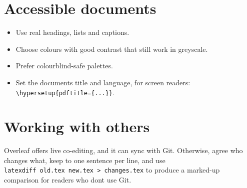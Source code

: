 \section{Accessible documents}\label{accessible-documents}

\begin{itemize}
\tightlist
\item
  Use real headings, lists and captions.
\item
  Choose colours with good contrast that still work in greyscale.
\item
  Prefer colourblind-safe palettes.
\item
  Set the document\textquotesingle s title and language, for screen readers: \texttt{\textbackslash{}hypersetup\{pdftitle=\{...\}\}}.
\end{itemize}

\section{Working with others}\label{working-with-others}

Overleaf offers live co-editing, and it can sync with Git. Otherwise, agree who changes what, keep to one sentence per line, and use \texttt{latexdiff\ old.tex\ new.tex\ \textgreater{}\ changes.tex} to produce a marked-up comparison for readers who don\textquotesingle t use Git.

